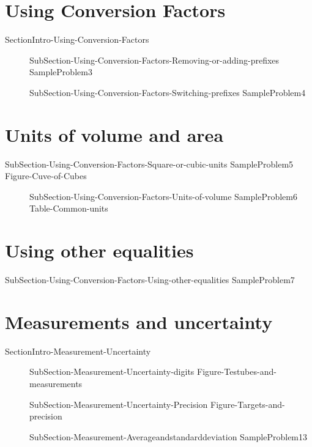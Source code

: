\documentclass[main.tex]{subfiles}
\newcommand\chapterlabel{Ch-measurements}\setcounter{figurenewcounter}{0}\setcounter{tablenewcounter}{0}\setcounter{formulanewcounter}{0}\chapterpicture{../{\chapterlabel}/figure1}\chapterpicturelabel{PngImg}
\begin{document}
\section{Using Conversion Factors}
{SectionIntro-Using-Conversion-Factors}
\sloppy\begin{description}
\item[]{SubSection-Using-Conversion-Factors-Removing-or-adding-prefixes}
{SampleProblem3}
\item[]{SubSection-Using-Conversion-Factors-Switching-prefixes}
{SampleProblem4}
\end{description}

\section{Units of volume and area}
{SubSection-Using-Conversion-Factors-Square-or-cubic-units}
{SampleProblem5}
{Figure-Cuve-of-Cubes}
\sloppy\begin{description}
\item[]{SubSection-Using-Conversion-Factors-Units-of-volume}
{SampleProblem6}
{Table-Common-units}
\end{description}


\section{Using other equalities}
{SubSection-Using-Conversion-Factors-Using-other-equalities}
{SampleProblem7}




\section{Measurements and uncertainty}
{SectionIntro-Measurement-Uncertainty}
\sloppy\begin{description}
\item[]{SubSection-Measurement-Uncertainty-digits}
{Figure-Testubes-and-measurements}		
 \item[]{SubSection-Measurement-Uncertainty-Precision}
{Figure-Targets-and-precision}		
 \item[]{SubSection-Measurement-Averageandstandarddeviation}
 {SampleProblem13}
\end{description}
\end{document}

